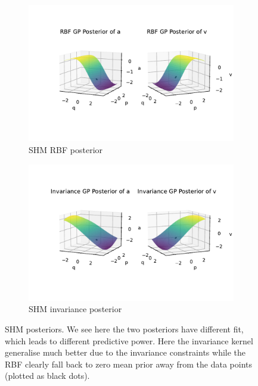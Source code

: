 \documentclass{statsmsc}
\begin{document}
\begin{figure}[H]
     \centering
     \begin{subfigure}[b]{\linewidth}
        \centering
        \includegraphics[width=\linewidth]{../codes/figures/posterior_shm_rbf.pdf}
        \caption{SHM RBF posterior}
        \label{fig:posterior_shm_rbf}
     \end{subfigure}
     \hfill
     \begin{subfigure}[b]{\linewidth}
         \centering
         \includegraphics[width=\linewidth]{../codes/figures/posterior_shm_invariance.pdf}
         \caption{SHM invariance posterior}
         \label{fig:posterior_shm_invariance}
     \end{subfigure}
        \caption{SHM posteriors. We see here the two posteriors have different fit, which leads to different predictive power. Here the invariance kernel generalise much better due to the invariance constraints while the RBF clearly fall back to zero mean prior away from the data points (plotted as black dots).}
        \label{fig:posterior_shm}
\end{figure}
\end{document}
